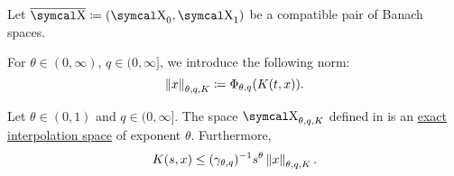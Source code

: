 \begin{definition}\label{def:k_functional_interpolation_space}
  Let \( \Ol{\CX} \coloneqq ( \CX_0, \CX_1 ) \) be a compatible pair of Banach spaces.

  For \( \theta \in (0, \infty) \), \( q \in (0, \infty] \), we introduce the following norm:
  \begin{equation}\label{eq:def:k_functional_interpolation_space/norm}
    \left\Vert x \right\Vert_{\theta,q,K} \coloneqq \Phi_{\theta,q}(K(t, x)).
  \end{equation}
\end{definition}

\begin{theorem}\label{thm:k_functional_interpolation}
  Let \( \theta \in (0, 1) \) and \( q \in (0, \infty] \). The space \( \CX_{\theta,q,K} \) defined in  is an \hyperref[thm:banach_interpolation_space_exponent]{exact interpolation space} of exponent \( \theta \). Furthermore,
  \begin{equation}\label{eq:thm:k_functional_interpolation/inequality}
    K(s, x) \leq (\gamma_{\theta,q})^{-1} s^\theta \left\Vert x \right\Vert_{\theta,q,K}.
  \end{equation}
\end{theorem}
